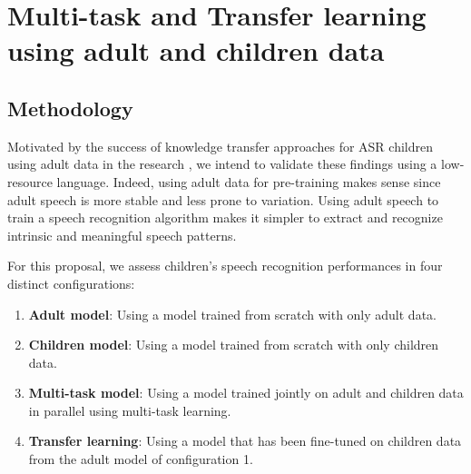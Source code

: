 

\section{Multi-task and Transfer learning using adult and children data}
\label{section:HMMDNNADULT2CHILD}
\subsection{Methodology}

Motivated by the success of knowledge transfer approaches for ASR children using adult data in the research \cite{TFchildren,TransferLF,2019multi}, we intend to validate these findings using a low-resource language. Indeed, using adult data for pre-training makes sense since adult speech is more stable and less prone to variation. Using adult speech to train a speech recognition algorithm makes it simpler to extract and recognize intrinsic and meaningful speech patterns.

For this proposal, we assess children's speech recognition performances in four distinct configurations:
\begin{enumerate}
    \item \textbf{Adult model}: Using a model trained from scratch with only adult data.
    \item \textbf{Children model}: Using a model trained from scratch with only children data.
    \item \textbf{Multi-task model}: Using a model trained jointly on adult and children data in parallel using multi-task learning.
    \item \textbf{Transfer learning}: Using a model that has been fine-tuned on children data from the adult model of configuration 1.
\end{enumerate}

